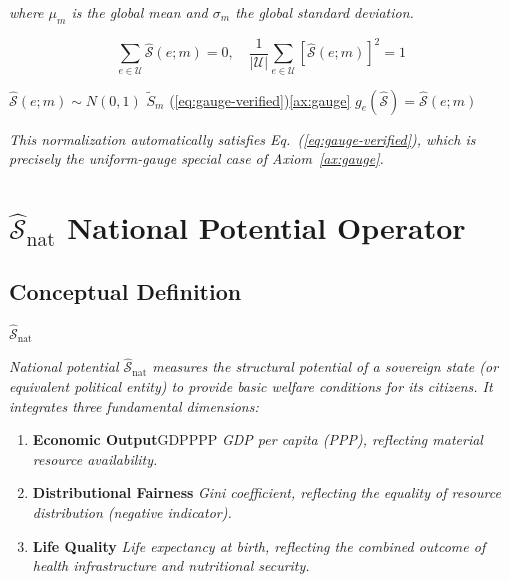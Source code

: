 \documentclass[11pt,a4paper]{article}
\theoremstyle{definition}
\newcommand{\Sop}{\hat{\mathcal{S}}}
\newcommand{\Sopnat}{\hat{\mathcal{S}}_{\text{nat}}}
\newcommand{\universe}{\mathcal{U}}
\begin{document}
\medskip
\noindent\textit{where $\mu_m$ is the global mean and $\sigma_m$ the global standard deviation.}

\noindent 
\begin{equation}
    \sum_{e \in \universe} \Sop(e; m) = 0, \quad
    \frac{1}{|\universe|} \sum_{e \in \universe} [\Sop(e; m)]^2 = 1
    \label{eq:gauge-verified}
\end{equation}

\noindent  $\Sop(e; m) \sim N(0,1)$  $\tilde{S}_m$ 
(\ref{eq:gauge-verified})\ref{ax:gauge}
$g_e(\Sop) = \Sop(e; m)$

\medskip
\noindent\textit{This normalization automatically satisfies Eq.~(\ref{eq:gauge-verified}), which is precisely the uniform-gauge special case of Axiom~\ref{ax:gauge}.}

\section{ $\Sopnat$ National Potential Operator}

\subsection{ Conceptual Definition}

 $\Sopnat$ 


\medskip
\noindent\textit{National potential $\Sopnat$ measures the structural potential of a sovereign state (or equivalent political entity) to provide basic welfare conditions for its citizens. It integrates three fundamental dimensions:}

\begin{enumerate}[leftmargin=*,label=\textbf{(\arabic*)}]
    \item \textbf{ Economic Output}GDPPPP
    \textit{GDP per capita (PPP), reflecting material resource availability.}
    
    \item \textbf{ Distributional Fairness}
    \textit{Gini coefficient, reflecting the equality of resource distribution (negative indicator).}
    
    \item \textbf{ Life Quality}
    \textit{Life expectancy at birth, reflecting the combined outcome of health infrastructure and nutritional security.}
\end{enumerate}
\end{document}
